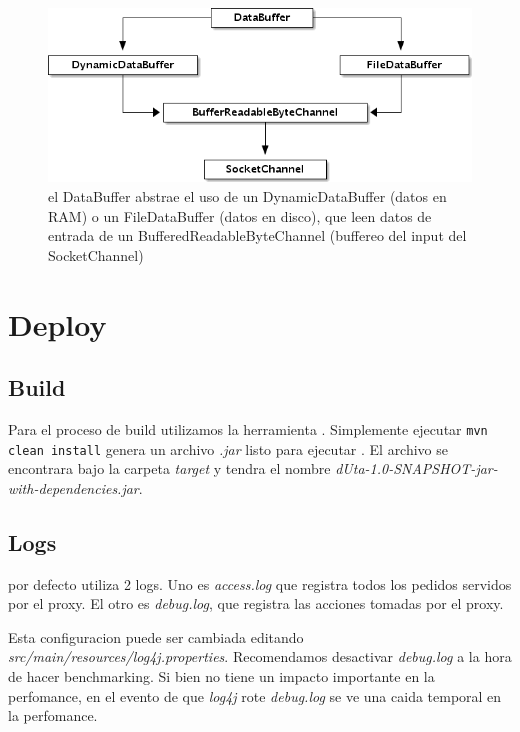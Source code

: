 \documentclass[11pt,a4paper,titlepage]{article}
\begin{document}
	\begin{figure}[ht]
    		\centering
    		\includegraphics[width=\textwidth]{img/buffer_diagram_pro.png}
    		\caption{el DataBuffer abstrae el uso de un DynamicDataBuffer (datos en RAM) o un
                     FileDataBuffer (datos en disco), que leen datos de entrada de un
                     BufferedReadableByteChannel (buffereo del input del SocketChannel)}
	\end{figure}

\newpage

\section{Deploy}
    \subsection{Build}
    Para el proceso de build utilizamos la herramienta .
    Simplemente ejecutar \texttt{mvn clean install} genera un archivo \textit{.jar} listo para ejecutar \duta.
    El archivo se encontrara bajo la carpeta \textit{target} y tendra el nombre \textit{dUta-1.0-SNAPSHOT-jar-with-dependencies.jar}.

    \subsection{Logs}
    \duta por defecto utiliza 2 logs.
    Uno es \textit{access.log} que registra todos los pedidos servidos por el proxy.
    El otro es \textit{debug.log}, que registra las acciones tomadas por el proxy.

    Esta configuracion puede ser cambiada editando \textit{src/main/resources/log4j.properties}.
    Recomendamos desactivar \textit{debug.log} a la hora de hacer benchmarking.
    Si bien no tiene un impacto importante en la perfomance, en el evento de que \textit{log4j} rote \textit{debug.log} se ve una caida temporal en la perfomance.
\end{document}
